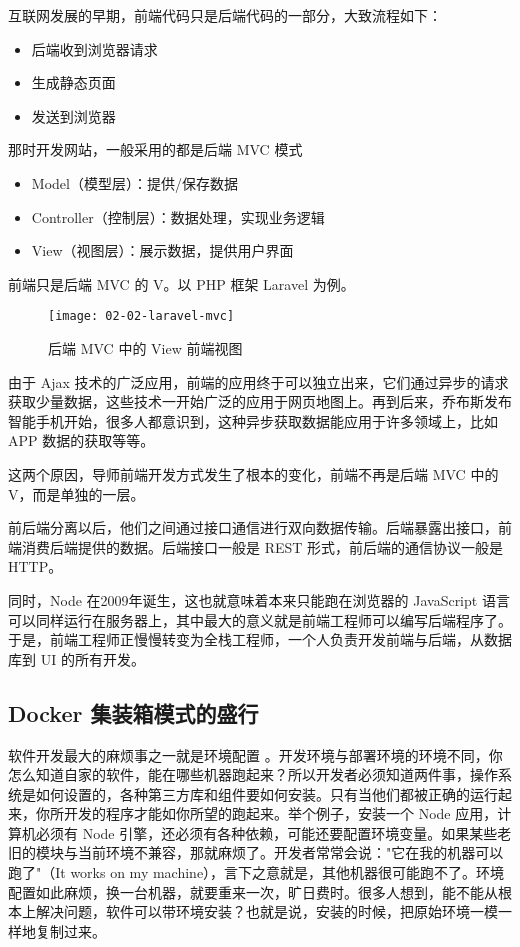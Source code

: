 互联网发展的早期，前端代码只是后端代码的一部分，大致流程如下：

\begin{itemize}
  \item 后端收到浏览器请求
  \item 生成静态页面
  \item 发送到浏览器
\end{itemize}

那时开发网站，一般采用的都是后端 MVC 模式

\begin{itemize}
  \item Model（模型层）：提供/保存数据
  \item Controller（控制层）：数据处理，实现业务逻辑
  \item View（视图层）：展示数据，提供用户界面
\end{itemize}

前端只是后端 MVC 的 V。以 PHP 框架 Laravel 为例。

\begin{figure}[htbp]
\centering
\texttt{[image: 02-02-laravel-mvc]}
\caption{后端 MVC 中的 View 前端视图}
\label{fig:02-02-laravel-mvc}
\end{figure}

由于 Ajax 技术的广泛应用，前端的应用终于可以独立出来，它们通过异步的请求获取少量数据，这些技术一开始广泛的应用于网页地图上。再到后来，乔布斯发布智能手机开始，很多人都意识到，这种异步获取数据能应用于许多领域上，比如 APP 数据的获取等等。

这两个原因，导师前端开发方式发生了根本的变化，前端不再是后端 MVC 中的 V，而是单独的一层。

前后端分离以后，他们之间通过接口通信进行双向数据传输。后端暴露出接口，前端消费后端提供的数据。后端接口一般是 REST 形式，前后端的通信协议一般是 HTTP。

同时，Node 在2009年诞生，这也就意味着本来只能跑在浏览器的 JavaScript 语言可以同样运行在服务器上，其中最大的意义就是前端工程师可以编写后端程序了。于是，前端工程师正慢慢转变为全栈工程师，一个人负责开发前端与后端，从数据库到 UI 的所有开发。

\subsection{Docker 集装箱模式的盛行}

软件开发最大的麻烦事之一就是环境配置
\cite{docker-thesis, ruyifengdocker}
。开发环境与部署环境的环境不同，你怎么知道自家的软件，能在哪些机器跑起来？所以开发者必须知道两件事，操作系统是如何设置的，各种第三方库和组件要如何安装。只有当他们都被正确的运行起来，你所开发的程序才能如你所望的跑起来。举个例子，安装一个 Node 应用，计算机必须有 Node 引擎，还必须有各种依赖，可能还要配置环境变量。如果某些老旧的模块与当前环境不兼容，那就麻烦了。开发者常常会说："它在我的机器可以跑了"（It works on my machine），言下之意就是，其他机器很可能跑不了。环境配置如此麻烦，换一台机器，就要重来一次，旷日费时。很多人想到，能不能从根本上解决问题，软件可以带环境安装？也就是说，安装的时候，把原始环境一模一样地复制过来。

